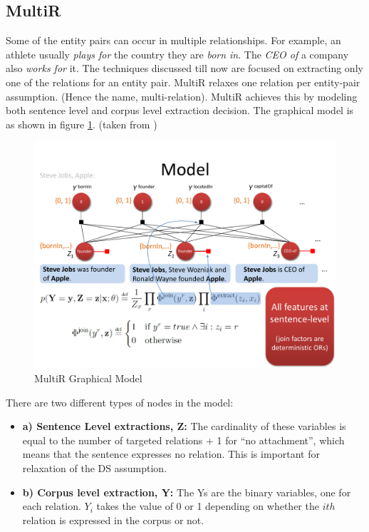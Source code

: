 \documentclass[a4paper,10pt]{article}
\begin{document}
\subsection{MultiR}\cite{multir}
Some of the entity pairs can occur in multiple relationships. For example, an athlete usually \emph{plays for} the 
country they are \emph{born in}. The \emph{CEO of} a company also \emph{works for} it. The techniques discussed till now are 
focused on extracting only one of the relations for an entity pair. MultiR relaxes one relation per entity-pair assumption. 
(Hence the name, multi-relation). MultiR achieves this by modeling both sentence level and corpus level extraction decision.
The graphical model is as shown in figure \ref{fig:multir}. (taken from \cite{multir})
\begin{figure}[H]
 \centering
 \includegraphics[bb=0 0 720 540,scale=0.45]{./multirmode1.pdf}
 \caption{MultiR Graphical Model}
 \label{fig:multir}
\end{figure}

There are two different types of nodes in the model:
\begin{itemize}

\item \textbf {a) Sentence Level extractions, Z:}
The cardinality of these variables is equal to the number of targeted relations + 1 for ``no attachment'', which means that 
the sentence expresses no relation. This is important for relaxation of the DS assumption.

\item \textbf{b) Corpus level extraction, Y:}
The Ys are the binary variables, one for each relation. $Y_i$ takes the value of 0 or 1 depending on whether the $ith$ relation is expressed 
in the corpus or not.
\end{itemize}
\end{document}
